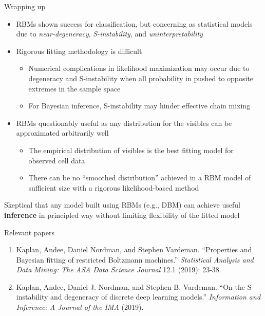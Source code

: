 \documentclass[ignorenonframetext,]{beamer}
\providecommand{\tightlist}{%
  \setlength{\itemsep}{0pt}\setlength{\parskip}{0pt}}
\theoremstyle{definition}
\begin{document}
\begin{frame}{Wrapping up}
\protect\hypertarget{wrapping-up}{}

\begin{itemize}
\tightlist
\item
  RBMs shown success for classification, but concerning as statistical
  models due to \emph{near-degeneracy}, \emph{S-instability}, and
  \emph{uninterpretability}
\item
  Rigorous fitting methodology is difficult

  \begin{itemize}
  \tightlist
  \item
    Numerical complications in likelihood maximization may occur due to
    degeneracy and S-instability when all probability in pushed to
    opposite extremes in the sample space
  \item
    For Bayesian inference, S-instability may hinder effective chain
    mixing
  \end{itemize}
\item
  RBMs questionably useful as any distribution for the visibles can be
  approximated arbitrarily well

  \begin{itemize}
  \tightlist
  \item
    The empirical distribution of visibles is the best fitting model for
    observed cell data
  \item
    There can be no ``smoothed distribution'' achieved in a RBM model of
    sufficient size with a rigorous likelihood-based method
  \end{itemize}
\end{itemize}

Skeptical that any model built using RBMs (e.g., DBM) can achieve useful
\textbf{inference} in principled way without limiting flexibility of the
fitted model

\end{frame}

\begin{frame}{Relevant papers}
\protect\hypertarget{relevant-papers}{}

\vfill

\begin{enumerate}
\tightlist
\item
  Kaplan, Andee, Daniel Nordman, and Stephen Vardeman. ``Properties and
  Bayesian fitting of restricted Boltzmann machines.'' \emph{Statistical
  Analysis and Data Mining: The ASA Data Science Journal} 12.1 (2019):
  23-38.
\end{enumerate}

\vspace{0.25in}

\begin{enumerate}
\setcounter{enumi}{1}
\tightlist
\item
  Kaplan, Andee, Daniel J. Nordman, and Stephen B. Vardeman. ``On the
  S-instability and degeneracy of discrete deep learning models.''
  \emph{Information and Inference: A Journal of the IMA} (2019).
\end{enumerate}

\vfill

\end{frame}
\end{document}
